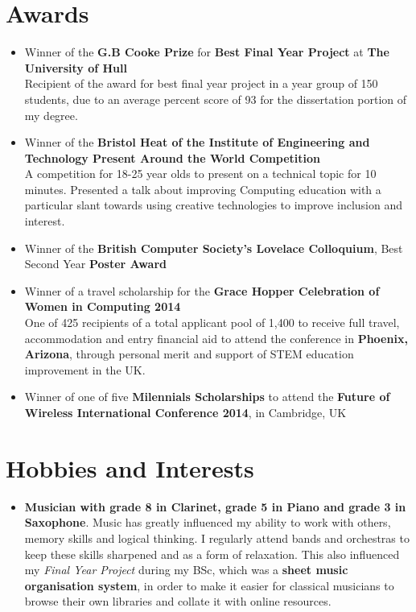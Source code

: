 \documentclass{article}
\begin{document}
\begin{flushleft}
\section*{Awards}
\begin{itemize}
\item Winner of the \textbf{G.B Cooke Prize} for \textbf{Best Final Year Project} at \textbf{The University of Hull}\\
\small Recipient of the award for best final year project in a year group of 150 students, due to an average percent score of 93 for the dissertation portion of my degree. 
\item Winner of the \textbf{Bristol Heat of the Institute of Engineering and Technology Present Around the World Competition} \\
\small A competition for 18-25 year olds to present on a technical topic for 10 minutes. Presented a talk about improving Computing education with a particular slant towards using creative technologies to improve inclusion and interest.
\item \normalsize Winner of the \textbf{British Computer Society's Lovelace Colloquium}, Best Second Year \textbf{Poster Award}
\item Winner of a travel scholarship for the \textbf{Grace Hopper Celebration of Women in Computing 2014}\\
 \small One of 425 recipients of a total applicant pool of 1,400 to receive full travel,  accommodation and entry financial aid to attend the conference in \textbf{Phoenix, Arizona}, through personal merit and support of STEM education improvement in the UK.
\item \normalsize Winner of one of five \textbf{Milennials Scholarships} to attend the \textbf{Future of Wireless International Conference 2014}, in Cambridge, UK 
\end{itemize}


\section*{Hobbies and Interests}
\begin{itemize}
\item \textbf{Musician with grade 8 in Clarinet, grade 5 in Piano and grade 3 in Saxophone}. Music has greatly influenced my ability to work with others, memory skills and logical thinking. I regularly attend bands and orchestras to keep these skills sharpened and as a form of relaxation. This also influenced my \textit{Final Year Project} during my BSc, which was a \textbf{sheet music organisation system}, in order to make it easier for classical musicians to browse their own libraries and collate it with online resources. 


\end{itemize}
\end{flushleft}
\end{document}
